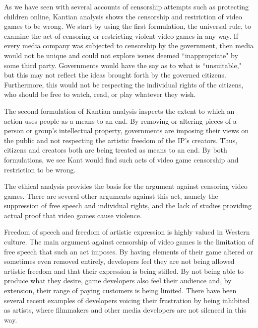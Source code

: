 
\indent \indent As we have seen with several accounts of censorship attempts such as protecting children online, Kantian analysis shows the censorship and restriction of video games to be wrong. We start by using the first formulation, the universal rule, to examine the act of censoring or restricting violent video games in any way. If every media company was subjected to censorship by the government, then media would not be unique and could not explore issues deemed ``inappropriate" by some third party. Governments would have the say as to what is ``unsuitable," but this may not reflect the ideas brought forth by the governed citizens. Furthermore, this would not be respecting the individual rights of the citizens, who should be free to watch, read, or play whatever they wish.

The second formulation of Kantian analysis inspects the extent to which an action uses people as a means to an end. By removing or altering pieces of a person or group's intellectual property, governments are imposing their views on the public and not respecting the artistic freedom of the IP's creators. Thus, citizens and creators both are being treated as means to an end. By both formulations, we see Kant would find such acts of video game censorship and restriction to be wrong. 

The ethical analysis provides the basis for the argument against censoring video games. There are several other arguments against this act, namely the suppression of free speech and individual rights, and the lack of studies providing actual proof that video games cause violence. %

Freedom of speech and freedom of artistic expression is highly valued in Western culture. The main argument against censorship of video games is the limitation of free speech that such an act imposes. By having elements of their game altered or sometimes even removed entirely, developers feel they are not being allowed artistic freedom and that their expression is being stifled. By not being able to produce what they desire, game developers also feel their audience and, by extension, their range of paying customers is being limited. There have been several recent examples of developers voicing their frustration by being inhibited as artists, where filmmakers and other media developers are not silenced in this way.


